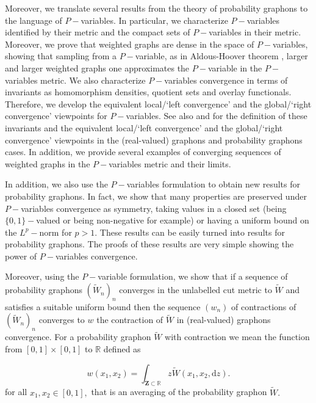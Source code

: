 \documentclass[11pt]{article}
\def\R{\mathbb{R}}
\newcommand{\Space}{\mathbf{Z}}
\begin{document}
Moreover, we translate several results from the theory of probability graphons to the language of $P-$variables. In particular, we characterize $P-$variables identified by their metric and the compact sets of $P-$variables in their metric. Moreover, we prove that weighted graphs are dense in the space of $P-$variables, showing that sampling from a $P-$variable, as in Aldous-Hoover theorem  \cite{aldous1981representations,aldous2010exchangeability,hoover1979relations,austin2008exchangeable}, larger and larger weighted graphs one approximates the $P-$variable in the $P-$variables metric. We also characterize $P-$variables convergence in terms of  invariants as homomorphism densities, quotient sets and overlay functionals. Therefore, we develop the equivalent local/`left convergence' and the global/`right convergence' viewpoints for $P-$variables. See also \cite{LovaszGraphLimits,borgs2011convergentAnnals,Lovsz2007SzemerdisLF, LOVASZ2006933} and \cite{abraham2023probabilitygraphons,zucal2024probabilitygraphonsrightconvergence} for the definition of these invariants and the equivalent local/`left convergence' and the global/`right convergence' viewpoints in the (real-valued) graphons and probability graphons cases. In addition, we provide several examples of converging sequences of weighted graphs in the $P-$variables metric and their limits.

In addition, we also use the $P-$variables formulation to obtain new results for probability graphons. 
In fact, we show that many properties are preserved under $P-$variables convergence as symmetry, taking values in a closed set (being $\{0,1\}-$valued or being non-negative for example) or having a uniform bound on the $L^p-$norm for $p>1$. These results can be easily turned into results for probability graphons. The proofs of these results are very simple showing the power of $P-$variables convergence.

Moreover, using the $P-$variable formulation, we show that if a sequence of probability graphons $(\widetilde{W}_n)_n$ converges in the unlabelled cut metric to $\widetilde{W}$ and satisfies a suitable uniform bound then the sequence $(w_n)$ of contractions of $(\widetilde{W}_n)_n$ converges to $w$ the contraction of $\widetilde{W}$ in (real-valued) graphons convergence. For a probability graphon $\widetilde{W}$ with contraction we mean the function from $[0,1]\times [0,1]$ to $\R$ defined as  

\begin{equation*}
w(x_1,x_2)=\int_{\Space \subset\mathbb{R}}z\widetilde W(x_1,x_2,\mathrm{d}z).
\end{equation*}
for all $x_1,x_2\in[0,1],$ that is an averaging of the probability graphon $\widetilde W.$
\end{document}
